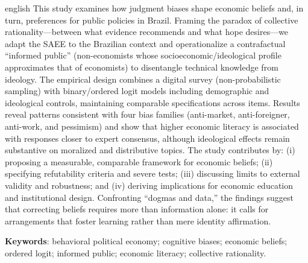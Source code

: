 
\begin{resumo}[Abstract]
 \begin{otherlanguage*}{english}
  This study examines how judgment biases shape economic beliefs and, in turn, preferences for public policies in Brazil. Framing the paradox of collective rationality—between what evidence recommends and what hope desires—we adapt the SAEE to the Brazilian context and operationalize a contrafactual “informed public” (non-economists whose socioeconomic/ideological profile approximates that of economists) to disentangle technical knowledge from ideology. The empirical design combines a digital survey (non-probabilistic sampling) with binary/ordered logit models including demographic and ideological controls, maintaining comparable specifications across items. Results reveal patterns consistent with four bias families (anti-market, anti-foreigner, anti-work, and pessimism) and show that higher economic literacy is associated with responses closer to expert consensus, although ideological effects remain substantive on moralized and distributive topics. The study contributes by: (i) proposing a measurable, comparable framework for economic beliefs; (ii) specifying refutability criteria and severe tests; (iii) discussing limits to external validity and robustness; and (iv) deriving implications for economic education and institutional design. Confronting “dogmas and data,” the findings suggest that correcting beliefs requires more than information alone: it calls for arrangements that foster learning rather than mere identity affirmation.

   \textbf{Keywords}: behavioral political economy; cognitive biases; economic beliefs; ordered logit; informed public; economic literacy; collective rationality.
 \end{otherlanguage*}
\end{resumo}
